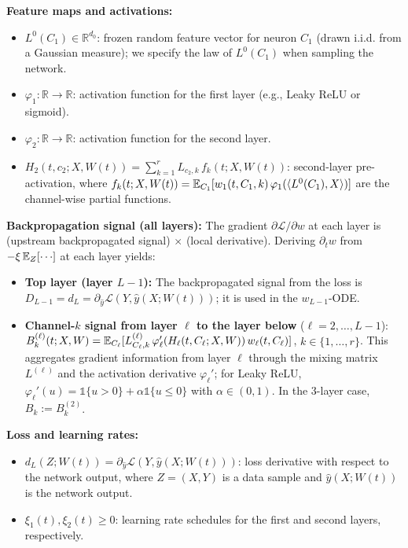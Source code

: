 \documentclass[nohyperref]{article}
\theoremstyle{plain}
\theoremstyle{definition}
\theoremstyle{remark}
\begin{document}
\textbf{Feature maps and activations:}
\begin{itemize}
\item $L^0(C_1) \in \mathbb{R}^{d_0}$: frozen random feature vector for neuron $C_1$ (drawn i.i.d. from a Gaussian measure); we specify the law of $L^0(C_1)$ when sampling the network.
\item $\varphi_1: \mathbb{R} \to \mathbb{R}$: activation function for the first layer (e.g., Leaky ReLU or sigmoid).
\item $\varphi_2: \mathbb{R} \to \mathbb{R}$: activation function for the second layer.
\item $H_2(t, c_2; X, W(t)) = \sum_{k=1}^r L_{c_2,k}\,f_k(t; X, W(t))$: second-layer pre-activation, where $f_k(t; X, W(t)) = \mathbb{E}_{C_1}[w_1(t, C_1, k)\,\varphi_1(\langle L^0(C_1), X \rangle)]$ are the channel-wise partial functions.
\end{itemize}

\textbf{Backpropagation signal (all layers):}
The gradient $\partial\mathscr{L}/\partial w$ at each layer is (upstream backpropagated signal) $\times$ (local derivative). Deriving $\partial_t w$ from $-\xi\,\E_Z[\cdots]$ at each layer yields:
\begin{itemize}
\item \textbf{Top layer (layer $L-1$):} The backpropagated signal from the loss is $D_{L-1}=d_L=\partial_{\hat{y}}\mathscr{L}(Y,\hat{y}(X;W(t)))$; it is used in the $w_{L-1}$-ODE.
\item \textbf{Channel-$k$ signal from layer $\ell$ to the layer below} ($\ell=2,\ldots,L-1$): $B_k^{(\ell)}(t;X,W) = \mathbb{E}_{C_\ell}[L^{(\ell)}_{C_\ell,k}\,\varphi_\ell'(H_\ell(t,C_\ell;X,W))\,w_\ell(t,C_\ell)]$, $k\in\{1,\ldots,r\}$. This aggregates gradient information from layer $\ell$ through the mixing matrix $L^{(\ell)}$ and the activation derivative $\varphi_\ell'$; for Leaky ReLU, $\varphi_\ell'(u)=\mathds{1}\{u>0\}+\alpha\mathds{1}\{u\le 0\}$ with $\alpha\in(0,1)$. In the 3-layer case, $B_k:=B_k^{(2)}$.
\end{itemize}

\textbf{Loss and learning rates:}
\begin{itemize}
\item $d_L(Z; W(t)) = \partial_{\hat{y}} \mathscr{L}(Y, \hat{y}(X; W(t)))$: loss derivative with respect to the network output, where $Z = (X, Y)$ is a data sample and $\hat{y}(X; W(t))$ is the network output.
\item $\xi_1(t), \xi_2(t) \ge 0$: learning rate schedules for the first and second layers, respectively.
\end{itemize}
\end{document}
